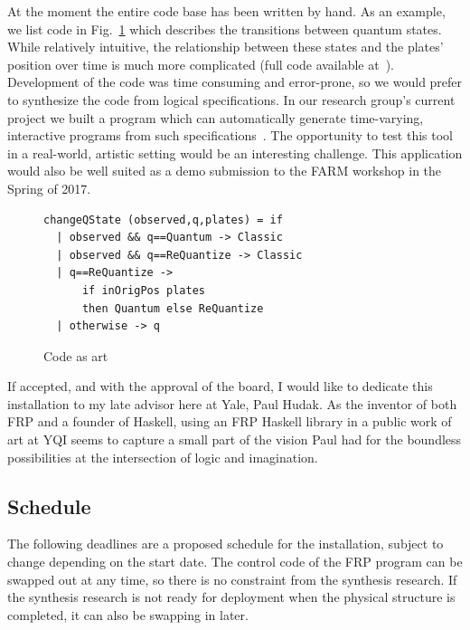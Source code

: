 At the moment the entire code base has been written by hand. 
As an example, we list code in Fig.~\ref{fig:code} which describes the transitions between quantum states.
While relatively intuitive, the relationship between these states and the plates' position over time is much more complicated (full code available at~\cite{github}).
Development of the code was time consuming and error-prone, so we would prefer to synthesize the code from logical specifications.
In our research group's current project we built a program which can automatically generate time-varying, interactive programs from such specifications~\cite{pldi}.
The opportunity to test this tool in a real-world, artistic setting would be an interesting challenge.
This application would also be well suited as a demo submission to the FARM workshop in the Spring of 2017.

\begin{figure}
\begin{lstlisting}
changeQState (observed,q,plates) = if
  | observed && q==Quantum -> Classic
  | observed && q==ReQuantize -> Classic
  | q==ReQuantize -> 
      if inOrigPos plates 
      then Quantum else ReQuantize
  | otherwise -> q
\end{lstlisting}
\label{fig:code}
\caption{Code as art}
\end{figure}


If accepted, and with the approval of the board, I would like to dedicate this installation to my late advisor here at Yale, Paul Hudak.
As the inventor of both FRP and a founder of Haskell, using an FRP Haskell library in a public work of art at YQI seems to capture a small part of the vision Paul had for the boundless possibilities at the intersection of logic and imagination.

\subsection{Schedule}

The following deadlines are a proposed schedule for the installation, subject to change depending on the start date.
The control code of the FRP program can be swapped out at any time, so there is no constraint from the synthesis research.
If the synthesis research is not ready for deployment when the physical structure is completed, it can also be swapping in later.

